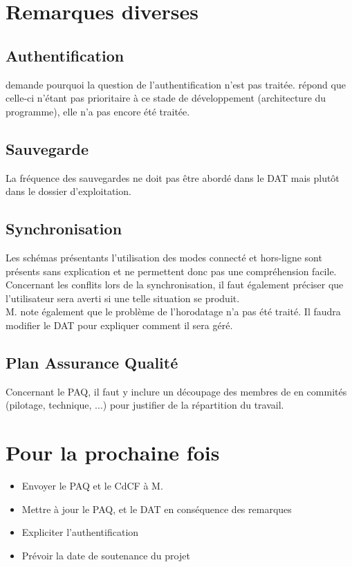 \documentclass[11pt,fleqn]{report}
\begin{document}
\section{Remarques diverses}

\subsection{Authentification}

\mo demande pourquoi la question de l'authentification n'est pas traitée. \amo répond que celle-ci n'étant pas prioritaire à ce stade de développement (architecture du programme), elle n'a pas encore été traitée.

\subsection{Sauvegarde}

La fréquence des sauvegardes ne doit pas être abordé dans le DAT mais plutôt dans le dossier d'exploitation.

\subsection{Synchronisation}

Les schémas présentants l'utilisation des modes \og{}connecté\fg{} et \og{}hors-ligne\fg{} sont présents sans explication et ne permettent donc pas une compréhension facile.\\
Concernant les conflits lors de la synchronisation, il faut également préciser que l'utilisateur sera averti si une telle situation se produit.\\
M. \Agopian note également que le problème de l'horodatage n'a pas été traité. Il faudra modifier le DAT pour expliquer comment il sera géré.

\subsection{Plan Assurance Qualité}

Concernant le PAQ, il faut y inclure un découpage des membres de \amo en commités (pilotage, technique, ...) pour justifier de la répartition du travail.

\section{Pour la prochaine fois}

\begin{itemize}
    \item Envoyer le PAQ et le CdCF à M. \Agopian
    \item Mettre à jour le PAQ, et le DAT en conséquence des remarques
    \item Expliciter l'authentification
    \item Prévoir la date de soutenance du projet
\end{itemize}
\end{document}
